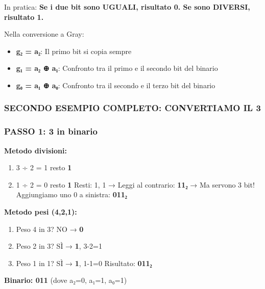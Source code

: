 \documentclass[
]{article}
\providecommand{\tightlist}{%
  \setlength{\itemsep}{0pt}\setlength{\parskip}{0pt}}
\begin{document}
In pratica: \textbf{Se i due bit sono UGUALI, risultato 0. Se sono DIVERSI, risultato 1.}

Nella conversione a Gray:

\begin{itemize}
\tightlist
\item
  \textbf{g₂ = a₂}: Il primo bit si copia sempre
\item
  \textbf{g₁ = a₂ ⊕ a₁}: Confronto tra il primo e il secondo bit del binario
\item
  \textbf{g₀ = a₁ ⊕ a₀}: Confronto tra il secondo e il terzo bit del binario
\end{itemize}

\hypertarget{secondo-esempio-completo-convertiamo-il-3}{%
\subsubsection{\texorpdfstring{\textbf{SECONDO ESEMPIO COMPLETO: CONVERTIAMO IL 3}}{SECONDO ESEMPIO COMPLETO: CONVERTIAMO IL 3}}\label{secondo-esempio-completo-convertiamo-il-3}}

\hypertarget{passo-1-3-in-binario}{%
\subsubsection{\texorpdfstring{\textbf{PASSO 1: 3 in binario}}{PASSO 1: 3 in binario}}\label{passo-1-3-in-binario}}

\textbf{Metodo divisioni:}

\begin{enumerate}
\def\labelenumi{\arabic{enumi}.}
\tightlist
\item
  3 ÷ 2 = 1 resto \textbf{1}
\item
  1 ÷ 2 = 0 resto \textbf{1}
  Resti: 1, 1 → Leggi al contrario: \textbf{11₂} → Ma servono 3 bit! Aggiungiamo uno 0 a sinistra: \textbf{011₂}
\end{enumerate}

\textbf{Metodo pesi (4,2,1):}

\begin{enumerate}
\def\labelenumi{\arabic{enumi}.}
\tightlist
\item
  Peso 4 in 3? NO → \textbf{0}
\item
  Peso 2 in 3? SÌ → \textbf{1}, 3-2=1
\item
  Peso 1 in 1? SÌ → \textbf{1}, 1-1=0
  Risultato: \textbf{011₂}
\end{enumerate}

\textbf{Binario: 011} (dove a₂=0, a₁=1, a₀=1)
\end{document}
